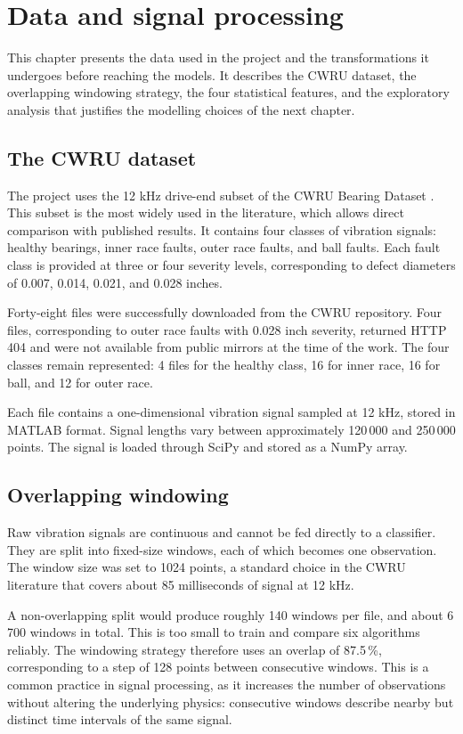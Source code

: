 \chapter{Data and signal processing}
\label{ch:data}

This chapter presents the data used in the project and the transformations it undergoes before reaching the models. It describes the CWRU dataset, the overlapping windowing strategy, the four statistical features, and the exploratory analysis that justifies the modelling choices of the next chapter.

\section{The CWRU dataset}

The project uses the 12 kHz drive-end subset of the CWRU Bearing Dataset \cite{smith2015rolling}. This subset is the most widely used in the literature, which allows direct comparison with published results. It contains four classes of vibration signals: healthy bearings, inner race faults, outer race faults, and ball faults. Each fault class is provided at three or four severity levels, corresponding to defect diameters of 0.007, 0.014, 0.021, and 0.028 inches.

Forty-eight files were successfully downloaded from the CWRU repository. Four files, corresponding to outer race faults with 0.028 inch severity, returned HTTP 404 and were not available from public mirrors at the time of the work. The four classes remain represented: 4 files for the healthy class, 16 for inner race, 16 for ball, and 12 for outer race.

Each file contains a one-dimensional vibration signal sampled at 12 kHz, stored in MATLAB format. Signal lengths vary between approximately 120\,000 and 250\,000 points. The signal is loaded through SciPy and stored as a NumPy array.

\section{Overlapping windowing}

Raw vibration signals are continuous and cannot be fed directly to a classifier. They are split into fixed-size windows, each of which becomes one observation. The window size was set to 1024 points, a standard choice in the CWRU literature that covers about 85 milliseconds of signal at 12 kHz.

A non-overlapping split would produce roughly 140 windows per file, and about 6\,700 windows in total. This is too small to train and compare six algorithms reliably. The windowing strategy therefore uses an overlap of 87.5\,\%, corresponding to a step of 128 points between consecutive windows. This is a common practice in signal processing, as it increases the number of observations without altering the underlying physics: consecutive windows describe nearby but distinct time intervals of the same signal.

